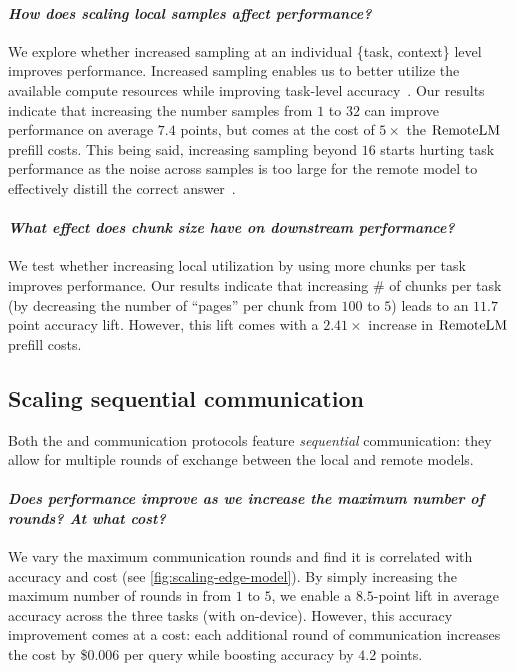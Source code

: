 \vspace{-0.75em}\paragraph{\textit{How does scaling local samples affect performance?}} We explore whether increased sampling at an individual \{task, context\} level improves performance. Increased sampling enables us to better utilize the available compute resources while improving task-level accuracy~\citep{brown2024large}. Our results indicate that increasing the number samples from $1$ to $32$ can improve performance on average $7.4$ points, but comes at the cost of $5\times$ the $\mathrm{RemoteLM}$ prefill costs. This being said, increasing sampling beyond $16$ starts hurting task performance as the noise across samples is too large for the remote model to effectively distill the correct answer~\citep{kuratov2024babilong}.

\vspace{-0.75em}\paragraph{\textit{What effect does chunk size have on downstream performance?}} We test whether increasing local utilization by using more chunks per task improves performance. Our results indicate that increasing \# of chunks per task (by decreasing the number of ``pages'' per chunk from $100$ to $5$) leads to an $11.7$ point accuracy lift. However, this lift comes with a $2.41\times$ increase in $\mathrm{RemoteLM}$ prefill costs. 



\vspace{-0.5em}\subsection{Scaling sequential communication}
\label{subsec:results-communication}




Both the \naive and \system communication protocols feature \textit{sequential} communication: they allow for multiple rounds of exchange between the local and remote models. 



\vspace{-0.75em}\paragraph{\textit{Does performance improve as we increase the maximum number of rounds? At what cost?}} We vary the maximum communication rounds and find it is correlated with accuracy and cost (see \cref{fig:scaling-edge-model}). By simply increasing the maximum number of rounds in \naive from $1$ to $5$, we enable a $8.5$-point lift in average accuracy across the three tasks (with \llamathreetwo on-device).
However, this accuracy improvement comes at a cost: each additional round of communication increases the cost by \$$0.006$ per query while boosting accuracy by $4.2$ points.



